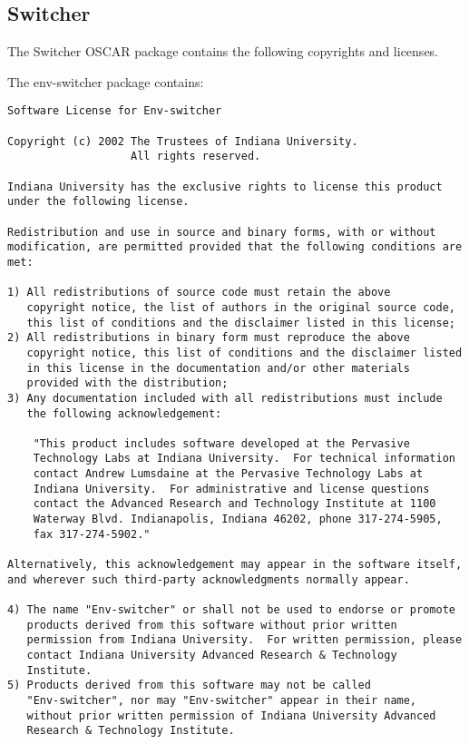 %
%
%
%

\subsection{Switcher}
The Switcher OSCAR package contains the following copyrights and licenses.

The env-switcher package contains:

\begin{verbatim}
Software License for Env-switcher

Copyright (c) 2002 The Trustees of Indiana University.  
                   All rights reserved.

Indiana University has the exclusive rights to license this product
under the following license.

Redistribution and use in source and binary forms, with or without
modification, are permitted provided that the following conditions are
met:

1) All redistributions of source code must retain the above
   copyright notice, the list of authors in the original source code,
   this list of conditions and the disclaimer listed in this license; 
2) All redistributions in binary form must reproduce the above
   copyright notice, this list of conditions and the disclaimer listed
   in this license in the documentation and/or other materials
   provided with the distribution; 
3) Any documentation included with all redistributions must include
   the following acknowledgement:

    "This product includes software developed at the Pervasive
    Technology Labs at Indiana University.  For technical information
    contact Andrew Lumsdaine at the Pervasive Technology Labs at
    Indiana University.  For administrative and license questions
    contact the Advanced Research and Technology Institute at 1100
    Waterway Blvd. Indianapolis, Indiana 46202, phone 317-274-5905,
    fax 317-274-5902."

Alternatively, this acknowledgement may appear in the software itself,
and wherever such third-party acknowledgments normally appear.

4) The name "Env-switcher" or shall not be used to endorse or promote
   products derived from this software without prior written
   permission from Indiana University.  For written permission, please
   contact Indiana University Advanced Research & Technology
   Institute.
5) Products derived from this software may not be called
   "Env-switcher", nor may "Env-switcher" appear in their name,
   without prior written permission of Indiana University Advanced
   Research & Technology Institute.


\end{verbatim}
